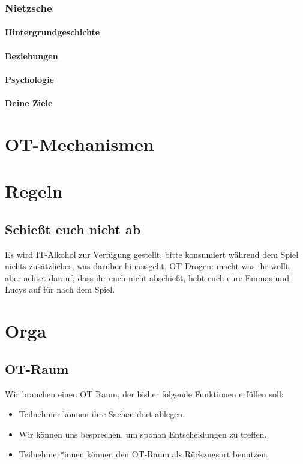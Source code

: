 \documentclass[12pt, a4paper, openany]{report}
\begin{document}
\subsection{Nietzsche}
\subsubsection{Hintergrundgeschichte}
\subsubsection{Beziehungen}
\subsubsection{Psychologie}
\subsubsection{Deine Ziele}


\chapter{OT-Mechanismen}

\chapter{Regeln}
\section{Schießt euch nicht ab}
Es wird IT-Alkohol zur Verfügung gestellt, bitte konsumiert während dem Spiel nichts zusätzliches, was darüber hinausgeht.
OT-Drogen: macht was ihr wollt, aber achtet darauf, dass ihr euch nicht abschießt, hebt euch eure Emmas und Lucys auf für nach dem Spiel.

\chapter{Orga}

\section{OT-Raum}
Wir brauchen einen OT Raum, der bisher folgende Funktionen erfüllen soll:
\begin{itemize}
    \item Teilnehmer können ihre Sachen dort ablegen.
    \item Wir können uns besprechen, um sponan Entscheidungen zu treffen.
    \item Teilnehmer*innen können den OT-Raum als Rückzugsort benutzen. 
\end{itemize}
\end{document}
